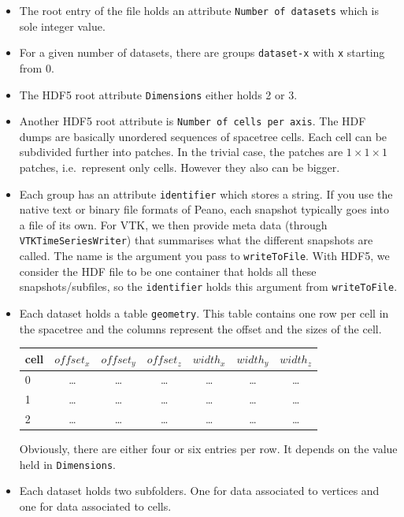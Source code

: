 \begin{itemize}
  \item The root entry of the file holds an attribute \texttt{Number of
  datasets} which is sole integer value.
  \item For a given number of datasets, there are groups \texttt{dataset-x} with
  \texttt{x} starting from 0.
  \item The HDF5 root attribute \texttt{Dimensions} either holds 2 or 3.
  \item Another HDF5 root attribute is \texttt{Number of cells per axis}. The
  HDF dumps are basically unordered sequences of spacetree cells. Each cell can
  be subdivided further into patches. In the trivial case, the patches are $1
  \times 1 \times 1$ patches, i.e.~represent only cells. However they also can
  be bigger.
  \item Each group has an attribute \texttt{identifier} which stores a string.
  If you use the native text or binary file formats of Peano, each snapshot
  typically goes into a file of its own. For VTK, we then provide meta data
  (through \texttt{VTKTimeSeriesWriter}) that summarises what the different
  snapshots are called. The name is the argument you pass to
  \texttt{writeToFile}. With HDF5, we consider the HDF file to be one container
  that holds all these snapshots/subfiles, so the \texttt{identifier} holds
  this argument from \texttt{writeToFile}.
  \item Each dataset holds a table \texttt{geometry}. This table contains
  one row per cell in the spacetree and the columns represent the offset and the sizes
  of the cell.
    \begin{center}
      \begin{tabular}{l|ccc|ccc}
        cell & $offset_x$ & $offset_y$ & $offset_z$ & $width_x$ & $width_y$ &
        $width_z$ \\ 
        \hline
        0 & \ldots & \ldots & \ldots & \ldots & \ldots & \ldots \\
        1 & \ldots & \ldots & \ldots & \ldots & \ldots & \ldots \\
        2 & \ldots & \ldots & \ldots & \ldots & \ldots & \ldots \\
      \end{tabular}
    \end{center}
  Obviously, there are either four or six entries per row. It depends on the
  value held in \texttt{Dimensions}.
  \item Each dataset holds two subfolders. One for data associated to vertices
  and one for data associated to cells.
\end{itemize}



